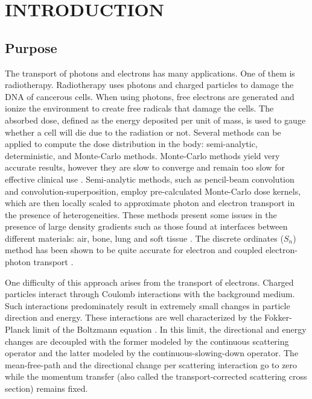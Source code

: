 \pagestyle{plain}
\setcounter{page}{1}
\chapter{\uppercase{Introduction}}
\section{Purpose}
The transport of photons and electrons has many applications. One of them is 
radiotherapy. Radiotherapy uses photons and charged particles to 
damage the DNA of cancerous cells. When using photons, free electrons are 
generated and ionize the environment to create free radicals that damage the cells. 
The absorbed dose, defined as the energy deposited per unit of mass, is used to 
gauge whether a cell will die due to the radiation or not. Several methods can be
applied to compute the dose distribution in the body: semi-analytic,
deterministic, and Monte-Carlo methods. Monte-Carlo methods yield very
accurate results, however they are slow to converge and remain too slow for
effective clinical use \cite{acuros,comet}. Semi-analytic methods, such as
pencil-beam convolution and convolution-superposition, employ pre-calculated
Monte-Carlo dose kernels, which are then locally scaled to approximate photon
and electron transport in the presence of heterogeneities. These methods
present some issues in the presence of large density gradients such as those
found at interfaces between different materials: air, bone, lung and soft
tissue \cite{acuros,seco,krieger}. The discrete ordinates ($S_n$) method has been 
shown to be quite accurate for electron and coupled electron-photon transport 
\cite{morel_81,accuracy_1,accuracy_2}.  

One difficulty of this approach arises from the transport of electrons. Charged 
particles interact through Coulomb interactions with the  background medium. 
Such interactions predominately result in extremely small changes 
in particle direction and energy. These interactions are well characterized by the
Fokker-Planck limit of the Boltzmann equation \cite{fp_limit,morel_96}. In this limit,
the directional and energy changes are decoupled with the former modeled by the
continuous scattering operator and the latter modeled by the continuous-slowing-down 
operator. The mean-free-path and the directional change per scattering interaction 
go to zero while the momentum transfer (also called the transport-corrected 
scattering cross section) remains fixed.


